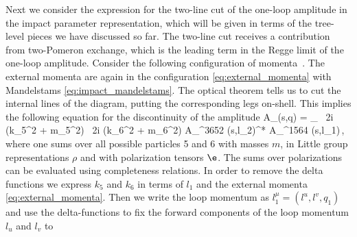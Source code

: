 Next we consider the expression for the two-line cut of the one-loop amplitude in the impact parameter representation, which will be given in terms of the tree-level pieces we have discussed so far.
The two-line cut receives a contribution from two-Pomeron exchange, which is the leading term in the Regge limit of the one-loop amplitude.
Consider the following configuration of momenta
	\beq
	\,.
\label{fig:momenta_1loop}
	\eeq
The external momenta are again in the configuration \eqref{eq:external_momenta} with Mandelstams \eqref{eq:impact_mandelstams}.
The optical theorem tells us to cut the internal lines of the diagram, putting the corresponding legs on-shell. This implies the following equation for the discontinuity of the amplitude
	 \Im A_{}(s,q) = \! \sum\limits_{}
	\int \!  \, 2\pi i \de(k_5^2 + m_5^2) \, 2\pi i \de(k_6^2 + m_6^2) 
	A_^{3652} (s,l_2)^*
	A_^{1564} (s,l_1)\,,
	\label{eq:optical_theorem_start}
	\eeq
where one sums over all possible particles 5 and 6 with masses $m$, in Little group representations $\rho$ and with 
polarization tensors $\e$. The sums over polarizations can be evaluated using completeness relations.
In order to remove the delta functions we express $k_5$ and $k_6$ in terms of $l_1$ and the external momenta \eqref{eq:external_momenta}.
Then we write the loop momentum as $l_1^\mu = (l^u,l^v,q_1)$
and use the delta-functions to fix the forward components of the loop momentum $l_u$ and $l_v$ to

